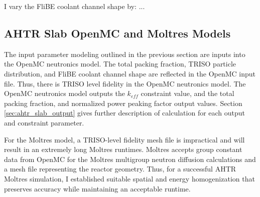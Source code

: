 I vary the FliBE coolant channel shape by: ...

\subsection{AHTR Slab OpenMC and Moltres Models}
\label{sec:ahtr-moltres-hom}
The input parameter modeling outlined in the previous section are inputs into 
the OpenMC neutronics model. 
The total packing fraction, TRISO particle distribution, and FliBE coolant 
channel shape are reflected in the OpenMC input file. 
Thus, there is TRISO level fidelity in the OpenMC neutronics model. 
The OpenMC neutronics model outputs the $k_{eff}$ constraint value, and the 
total packing fraction, and normalized power peaking factor output values. 
Section \ref{sec:ahtr_slab_output} gives further description of calculation for 
each output and constraint parameter.

For the Moltres model, a TRISO-level fidelity mesh file is impractical 
and will result in an extremely long Moltres runtimes. 
Moltres accepts group constant data from OpenMC for the Moltres multigroup 
neutron diffusion calculations and a mesh file representing the reactor geometry. 
Thus, for a successful \gls{AHTR} Moltres simulation, I established 
suitable spatial and energy homogenization that preserves accuracy while 
maintaining an acceptable runtime.


